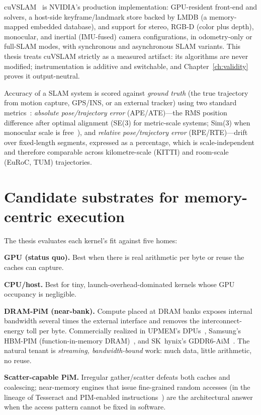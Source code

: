 cuVSLAM~\cite{cuvslam2025} is NVIDIA's production implementation: GPU-resident
front-end and solvers, a host-side keyframe/landmark store backed by LMDB (a
memory-mapped embedded database), and support for stereo, RGB-D (color plus
depth), monocular, and inertial (IMU-fused) camera configurations, in
odometry-only or full-SLAM modes, with synchronous and asynchronous SLAM
variants. This thesis treats cuVSLAM strictly as a measured artifact: its
algorithms are never modified; instrumentation is additive and switchable,
and Chapter~\ref{ch:validity} proves it output-neutral.

Accuracy of a SLAM system is scored against \emph{ground truth} (the true
trajectory from motion capture, GPS/INS, or an external tracker) using two
standard metrics~\cite{sturm2012tum,zhang2018tutorial}: \emph{absolute
pose/trajectory error} (APE/ATE)---the RMS position difference after optimal
alignment (SE(3) for metric-scale systems; Sim(3) when monocular scale is
free~\cite{umeyama1991}), and \emph{relative pose/trajectory error}
(RPE/RTE)---drift over fixed-length segments, expressed as a percentage,
which is scale-independent and therefore comparable across
kilometre-scale (KITTI) and room-scale (EuRoC, TUM) trajectories.

\section{Candidate substrates for memory-centric execution}
\label{sec:bg-substrates}

The thesis evaluates each kernel's fit against five homes:

\textbf{GPU (status quo).} Best when there is real arithmetic per byte or
reuse the caches can capture.

\textbf{CPU/host.} Best for tiny, launch-overhead-dominated kernels whose GPU
occupancy is negligible.

\textbf{DRAM-PiM (near-bank).} Compute placed at DRAM banks exposes internal
bandwidth several times the external interface and removes the
interconnect-energy toll per byte. Commercially realized in UPMEM's
DPUs~\cite{gomezluna2021upmem}, Samsung's HBM-PIM (function-in-memory
DRAM)~\cite{kwon2021hbmpim}, and SK~hynix's GDDR6-AiM~\cite{lee2022aim}.
The natural tenant is \emph{streaming, bandwidth-bound} work: much data,
little arithmetic, no reuse.

\textbf{Scatter-capable PiM.} Irregular gather/scatter defeats both caches
and coalescing; near-memory engines that issue fine-grained random accesses
(in the lineage of Tesseract and PIM-enabled
instructions~\cite{ahn2015tesseract,ahn2015pei}) are the architectural answer
when the access pattern cannot be fixed in software.

